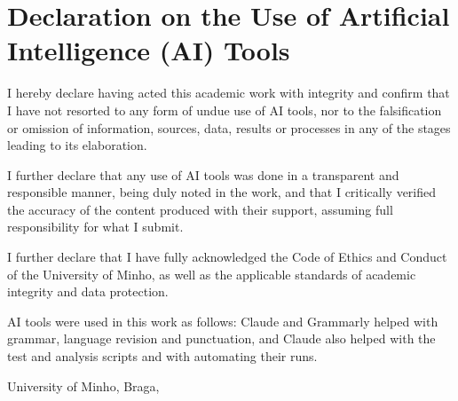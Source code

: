 \chapter*{Declaration on the Use of Artificial Intelligence (AI) Tools}
\setlength{\parskip}{1em}
\noindent
I hereby declare having acted this academic work with integrity and confirm that I have not resorted to any form of undue use of AI tools, nor to the falsification or omission of information, sources, data, results or processes in any of the stages leading to its elaboration.

\noindent
I further declare that any use of AI tools was done in a transparent and responsible manner, being duly noted in the work, and that I critically verified the accuracy of the content produced with their support, assuming full responsibility for what I submit.

\noindent
I further declare that I have fully acknowledged the Code of Ethics and Conduct of the University of Minho, as well as the applicable standards of academic integrity and data protection.

\noindent
AI tools were used in this work as follows: Claude and Grammarly helped with grammar, language revision and punctuation, and Claude also helped with the test and analysis scripts and with automating their runs.

\phantom{space}

\noindent
University of Minho, Braga, \myear

\vspace{25mm}
\noindent\theauthor
\setlength{\parskip}{0em}
